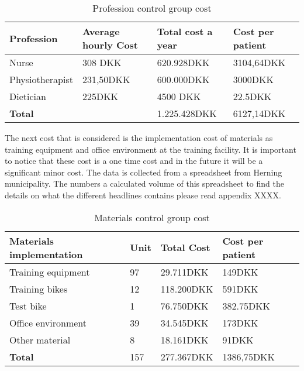 \begin{table}[H]
\begin{longtabu} to 
    \textbf{Profession} & \textbf{Average hourly Cost} & \textbf{Total cost a year} & \textbf{Cost per patient} \\[-1ex]
    \midrule
     Nurse   &    308 DKK & 620.928DKK & 3104,64DKK \\ \hline
    Physiotherapist   &   231,50DKK  & 600.000DKK & 3000DKK \\ \hline
    Dietician   &  225DKK &    4500 DKK    & 22.5DKK \\ 
    \hline \hline \hline
    \textbf{Total} & & 1.225.428DKK & 6127,14DKK
    \newline
   \end{longtabu}
\caption{Profession control group cost}
\label{tab: PC}
\end{table}

The next cost that is considered is the implementation cost of materials as training equipment and office environment at the training facility. It is important to notice that these cost is a one time cost and in the future it will be a significant minor cost. The data is collected from a spreadsheet from Herning municipality. The numbers a calculated volume of this spreadsheet to find the details on what the different headlines contains please read appendix XXXX. 

\begin{table}[H]
\begin{longtabu} to 
    \textbf{Materials implementation} & \textbf{Unit} &\textbf{Total Cost} & \textbf{Cost per patient} \\[-1ex]
    \midrule
    Training equipment   &  97 &  29.711DKK & 149DKK \\ \hline
    Training bikes   & 12 & 118.200DKK & 591DKK  \\ \hline
    Test bike    &  1 & 76.750DKK &   382.75DKK \\ \hline 
    Office environment    &  39 & 34.545DKK  &   173DKK  \\ \hline 
    Other material   &  8 & 18.161DKK  &   91DKK\\
    \hline \hline \hline
    \textbf{Total} & 157 & 277.367DKK & 1386,75DKK
    \newline
   \end{longtabu}
\caption{Materials control group cost}
\label{tab: MC}
\end{table}

